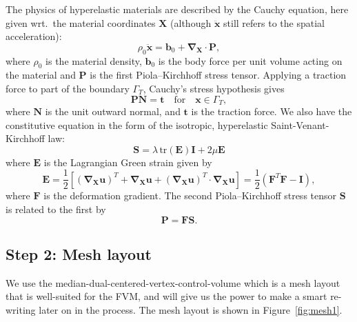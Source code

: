 \documentclass[acmtog]{acmart}
\begin{document}
The physics of hyperelastic materials are described by the Cauchy equation, here given wrt.\ the material coordinates $\boldsymbol X$ (although $\ddot{\boldsymbol x}$ still refers to the spatial acceleration):
%
\begin{equation}
  \rho_0 \ddot{\boldsymbol x} = \boldsymbol b_0 + \boldsymbol \nabla_{\boldsymbol X} \cdot \boldsymbol P, \label{eq:cauchy}
\end{equation}
%
where $\rho_0$ is the material density, $\boldsymbol b_0$ is the body force per unit volume acting on the material and $\boldsymbol P$ is the first Piola–Kirchhoff stress tensor. Applying a traction force to part of the boundary $\Gamma_T$, Cauchy's stress hypothesis gives
%
\begin{equation}
  \boldsymbol P \boldsymbol N = \boldsymbol t \quad \text{for} \quad \boldsymbol x \in \Gamma_T,
\end{equation}
%
where $\boldsymbol N$ is the unit outward normal, and $\boldsymbol t$ is the traction force. We also have the constitutive equation in the form of the isotropic, hyperelastic Saint-Venant-Kirchhoff law:
%
\begin{equation}
  \boldsymbol S = \lambda \,\mathrm{tr}(\boldsymbol E) \boldsymbol I + 2 \mu \boldsymbol E
\end{equation}
%
where $\boldsymbol E$ is the Lagrangian Green strain given by
%
\begin{equation}
  \boldsymbol E = \frac{1}{2} \left[ {(\boldsymbol \nabla_{\boldsymbol X} \boldsymbol u)}^T + \boldsymbol \nabla _{\boldsymbol X} \boldsymbol u + {(\boldsymbol \nabla _{\boldsymbol X} \boldsymbol u)}^T \cdot \boldsymbol \nabla _{\boldsymbol X} \boldsymbol u \right]  = \frac{1}{2} (\boldsymbol F^T \boldsymbol F - \boldsymbol I),
\end{equation}
%
where $\boldsymbol F$ is the deformation gradient. The second Piola–Kirchhoff stress tensor  $\boldsymbol S$ is related to the first by
%
\begin{equation}
  \boldsymbol P = \boldsymbol F \boldsymbol S.
\end{equation}
%
\subsection*{Step 2: Mesh layout}
We use the median-dual-centered-vertex-control-volume which is a mesh layout that is well-suited for the FVM, and will give us the power to make a smart re-writing later on in the process. The mesh layout is shown in Figure\ \ref{fig:mesh1}.
\end{document}
